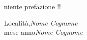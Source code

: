 %
%
%

\preface

niente prefazione !!


\vspace{1cm}
\begin{flushright}\noindent
Localit\`{a},\hfill {\it Nome Cognome}\\
mese anno\hfill {\it Nome Cognome}\\
\end{flushright}


